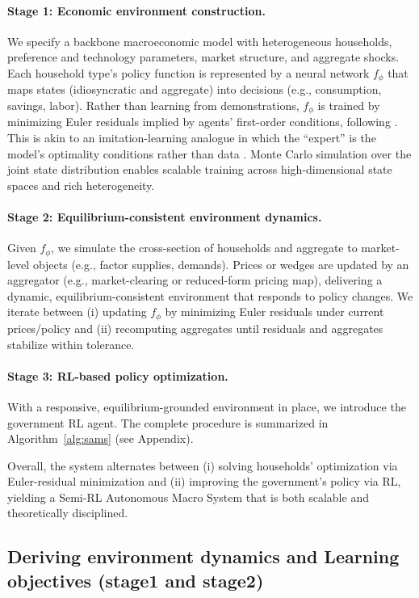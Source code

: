 \documentclass[11pt]{article}
\begin{document}
\paragraph{Stage 1: Economic environment construction.}
We specify a backbone macroeconomic model with heterogeneous households, preference and technology parameters, market structure, and aggregate shocks. Each household type’s policy function is represented by a neural network $f_{\phi}$ that maps states (idiosyncratic and aggregate) into decisions (e.g., consumption, savings, labor). Rather than learning from demonstrations, $f_{\phi}$ is trained by minimizing Euler residuals implied by agents’ first-order conditions, following \cite{maliar2021deep}. This is akin to an imitation-learning analogue in which the ``expert'' is the model’s optimality conditions rather than data \cite{ho2016generative}. Monte Carlo simulation over the joint state distribution enables scalable training across high-dimensional state spaces and rich heterogeneity.

\paragraph{Stage 2: Equilibrium-consistent environment dynamics.}
Given $f_{\phi}$, we simulate the cross-section of households and aggregate to market-level objects (e.g., factor supplies, demands). Prices or wedges are updated by an aggregator (e.g., market-clearing or reduced-form pricing map), delivering a dynamic, equilibrium-consistent environment that responds to policy changes. We iterate between (i) updating $f_{\phi}$ by minimizing Euler residuals under current prices/policy and (ii) recomputing aggregates until residuals and aggregates stabilize within tolerance.

\paragraph{Stage 3: RL-based policy optimization.}
With a responsive, equilibrium-grounded environment in place, we introduce the government RL agent. 
The complete procedure is summarized in Algorithm~\ref{alg:sams} (see Appendix).

\medskip
\noindent
Overall, the system alternates between (i) solving households’ optimization via Euler-residual minimization and (ii) improving the government’s policy via RL, yielding a Semi-RL Autonomous Macro System that is both scalable and theoretically disciplined.


\subsection{Deriving environment dynamics and Learning objectives (stage1 and stage2)}
\end{document}
